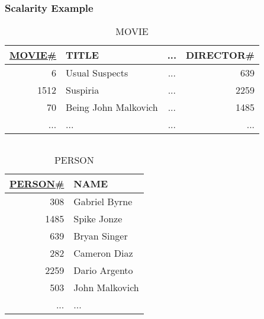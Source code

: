 \documentclass[dvipsnames]{beamer}
\theoremstyle{plain}
\begin{document}
\begin{frame}
  \frametitle{Scalarity Example}

  \vspace{-12pt}
  \begin{footnotesize}
  \begin{table}
    \caption{MOVIE}
    \begin{tabular}{|r|l|c|r|}\hline
\underline{MOVIE\#} & TITLE                & ... & DIRECTOR\#\\[2pt]\hline\hline
                  6 & Usual Suspects       & ... &        639\\\hline
               1512 & Suspiria             & ... &       2259\\\hline
                 70 & Being John Malkovich & ... &       1485\\\hline
                ... & ...                  & ... &        ...\\\hline
    \end{tabular}
  \end{table}
  \end{footnotesize}

  \vspace{-24pt}
  \begin{columns}[t]
    \begin{footnotesize}
    \begin{table}
      \caption{PERSON}
      \begin{tabular}{|r|l|}\hline
\underline{PERSON\#} & NAME          \\[2pt]\hline\hline
                 308 & Gabriel Byrne \\\hline
                1485 & Spike Jonze   \\\hline
                 639 & Bryan Singer  \\\hline
                 282 & Cameron Diaz  \\\hline
                2259 & Dario Argento \\\hline
                 503 & John Malkovich\\\hline
                 ... & ...           \\\hline
      \end{tabular}
    \end{table}
    \end{footnotesize}


\end{columns}
\end{frame}
\end{document}
